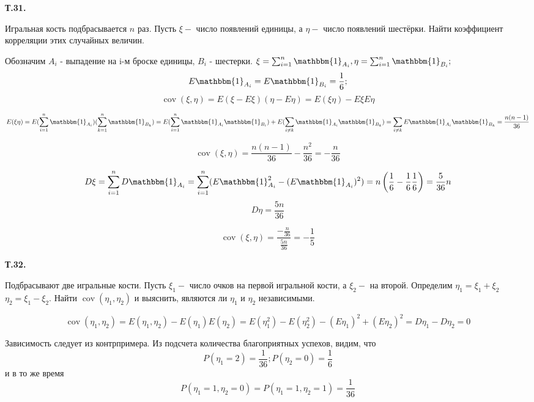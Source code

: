 \documentclass[a4paper,12pt]{article} %
\begin{document}
\begin{example} \textbf{Т.31.} 


Игральная кость подбрасывается $n$ раз.
Пусть $\xi-$ число появлений единицы, а $\eta-$ число появлений шестёрки. 
Найти коэффициент корреляции этих случайных величин.


Обозначим $ A_i$ - выпадение на i-м броске единицы, $B_i$ - шестерки.
$ \xi =\sum_{i=1}^{n} \mathbbm{1}_{A_i},  \eta = \sum_{i=1}^{n} \mathbbm{1}_{B_i}; $
\[ E \mathbbm{1}_{A_i}= E  \mathbbm{1}_{B_i}=\frac{1}{6} ;  \]
%
\[ \operatorname{cov} (\xi, \eta) =
E(\xi-E\xi) (\eta- E\eta)= E(\xi\eta)-E\xi E\eta\]

\[ E(\xi\eta)=E(\sum_{i=1}^{n}\mathbbm{1}_{A_i}) (\sum_{k=1}^{n}\mathbbm{1}_{B_k})= E(\sum_{i=1}^{n}\mathbbm{1}_{A_i}\mathbbm{1}_{B_i})+E(\sum_{i\ne k} \mathbbm{1}_{A_i} \mathbbm{1}_{B_k}) =\sum_{i\ne k} E \mathbbm{1}_{A_i} \mathbbm{1}_{B_k}=\frac{n(n-1)}{36} \]

\[ \operatorname{cov}(\xi,\eta)=
\frac{n(n-1)}{36}-\frac{n^2}{36}=-\frac{n}{36}  \]


\[ D\xi =\sum_{i=1}^{n} D \mathbbm{1}_{A_i} = \sum_{i=1}^{n}(E \mathbbm{1}_{A_i}^2- (E\mathbbm{1}_{A_i})^2 ) =
 n\left(\frac{1}{6}-\frac{1}{6}\frac{1}{6}\right) = \frac{5}{36}n\]
\[ D \eta =\frac{5n}{36} \]

\[ \operatorname{cov}(\xi,\eta)=\dfrac{-\frac{n}{36}}{\frac{5n}{36}}=-\frac{1}{5} \]


\end{example}



\begin{example} \textbf{Т.32.} 

Подбрасывают две игральные кости. 
Пусть $\xi_{1}-$ число очков на первой игральной кости, а $\xi_{2}-$ на второй. 
Определим $\eta_{1}=\xi_{1}+\xi_{2}$ $\eta_{2}=\xi_{1}-\xi_{2} .$ 
Найти $\operatorname{cov}\left(\eta_{1},\eta_{2}\right)$ и выяснить, являются ли $\eta_{1}$ и $\eta_{2}$ независимыми.



\[ \operatorname{cov}(\eta_{1},\eta_{2})=
E(\eta_{1},\eta_{2})-E(\eta_{1}) E(\eta_{2}) =
E(\eta_{1}^2)- E(\eta_{2}^2)-(E\eta_{1})^2
+(E\eta_{2})^2= D\eta_{1} - D \eta_{2}= 0\]

Зависимость следует из контрпримера.
Из подсчета количества благоприятных успехов, видим, что
\[ P(\eta_1=2)=\frac{1}{36}; P(\eta_2 =0) = \frac{1}{6} \]
и в то же время
\[ P(\eta_{1}=1, \eta_{2}=0)=P (\eta_{1}=1, \eta_{2}=1)= \frac{1}{36} \]


\end{example}
\end{document}
